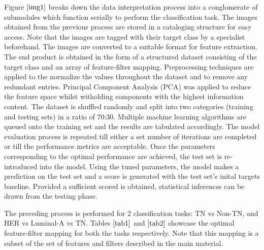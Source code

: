 \documentclass[10pt,final,1p,times,twocolumn]{elsarticle}
\begin{document}
Figure $\ref{img1}$ breaks down the data interpretation process into a conglomerate of submodules which function serially to perform the classification task. The images obtained from the previous process are stored in a cataloging structure for easy access. Note that the images are tagged with their target class by a specialist beforehand. The images are converted to a suitable format for feature extraction. The end product is obtained in the form of a structured dataset consisting of the target class and an array of feature-filter mapping. Preprocessing techniques are applied to the normalize the values throughout the dataset and to remove any redundant entries. Principal Component Analysis (PCA) was applied to reduce the feature space whilst witholding components with the highest information content. The dataset is shuffled randomly and split into two categories (training and testing sets) in a ratio of 70:30. Multiple machine learning algorithms are queued onto the training set and the results are tabulated accordingly. The model evaluation process is repeated till either a set number of iterations are completed or till the performance metrics are acceptable. Once the parameters corresponding to the optimal performance are achieved, the test set is re-introduced into the model. Using the tuned parameters, the model makes a prediction on the test set and a score is generated with the test set's inital targets baseline. Provided a sufficient scored is obtained, statistical inferences can be drawn from the testing phase. 

The preceding process is performed for 2 classification tasks: TN vs Non-TN, and HER vs Luminal-A vs TN. Tables $\ref{tab1}$ and $\ref{tab2}$ showcase the optimal feature-filter mapping for both the tasks respectively. Note that this mapping is a subset of the set of features and filters described in the main material.          
\end{document}
